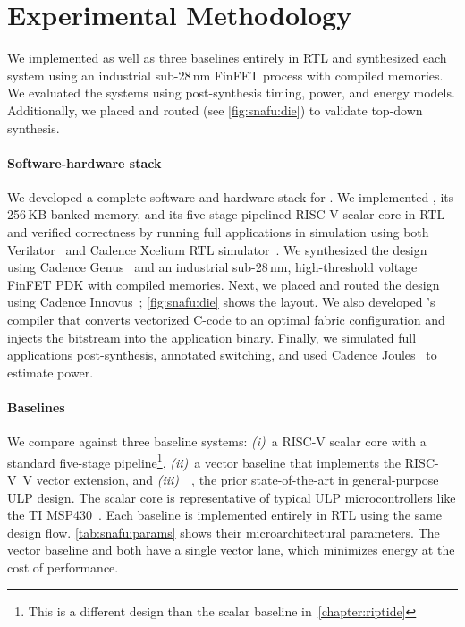 \section{Experimental Methodology}
\label{snafu:method}

\figSNAFUDie

We implemented \snafuarch as well as three baselines entirely in RTL and synthesized each system using
an industrial sub-28\,nm FinFET process with compiled memories.
% 
We evaluated the systems using post-synthesis timing, power, and energy models.
% 
Additionally, we placed and routed \snafuarch (see \autoref{fig:snafu:die}) to validate top-down synthesis.

\paragraph{Software-hardware stack}
We developed a complete software and hardware stack for \snafu.
% 
We implemented \snafuarch, its 256\,KB banked memory, and its five-stage pipelined \mbox{RISC-V} scalar core in RTL and verified correctness by running full applications in simulation using both Verilator~\cite{snyder2004verilator} and Cadence Xcelium RTL simulator~\cite{xcelium}.
% 
We synthesized the design using Cadence Genus~\cite{genus} and an industrial sub-28\,nm, high-threshold voltage FinFET PDK with compiled memories.
% 
Next, we placed and routed the design using Cadence Innovus~\cite{innovus};
% 
\autoref{fig:snafu:die} shows the layout.
% 
We also developed \snafuframe's compiler that converts vectorized C-code to an optimal fabric configuration and injects the bitstream into the application binary.
% 
Finally, we simulated full applications post-synthesis, annotated switching, and
used Cadence Joules~\cite{joules} to estimate power.

\tabSNAFUTabs

\paragraph{Baselines}
We compare \snafuarch against three baseline systems:
\emph{(i)}~a RISC-V scalar core with a standard five-stage pipeline\footnote{This is a different design than the scalar baseline in~\autoref{chapter:riptide}},
\emph{(ii)}~a vector baseline that implements the \mbox{RISC-V V} vector extension,
and \emph{(iii)}~\manic~\cite{manic}, the prior state-of-the-art in general-purpose ULP design.
%
The scalar core is representative of typical ULP microcontrollers like the TI MSP430~\cite{msp430fr5994}.
% 
Each baseline is implemented entirely in RTL using the same design flow. 
%
\autoref{tab:snafu:params} shows their microarchitectural parameters.
%
The vector baseline and \manic both have a single vector lane, which minimizes energy at the cost of performance.

